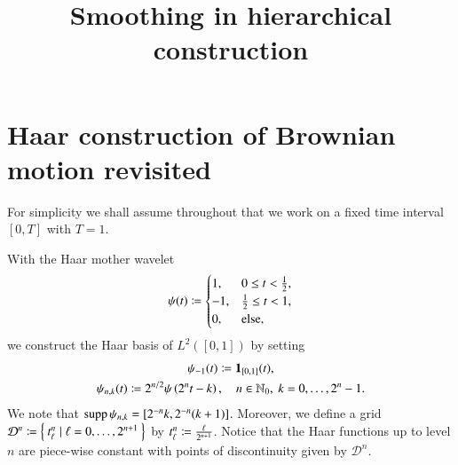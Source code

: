 \documentclass{amsart}
\begin{document}
\title{Smoothing in hierarchical construction}

\maketitle

\section{Haar construction of Brownian motion revisited}
\label{sec:haar-constr-brown}

For simplicity we shall assume throughout that we work on a fixed time
interval $[0,T]$ with $T = 1$.

With the Haar mother wavelet
\begin{equation}
  \label{eq:Haar-mother}
  \psi(t) \coloneqq
  \begin{cases}
    1, & 0 \le t < \frac{1}{2}, \\
    -1, & \frac{1}{2} \le t < 1, \\
    0, & \text{else},
  \end{cases}
\end{equation}
we construct the Haar basis of $L^2\left([0,1] \right)$ by setting
\begin{subequations}
  \label{eq:Haar-basis}
  \begin{gather}
    \label{eq:Haar-constant}
    \psi_{-1}(t) \coloneqq \mathbf{1}_{[0,1]}(t), \\
    \label{eq:Haar-nonconstant}
    \psi_{n,k}(t) \coloneqq 2^{n/2} \psi\left( 2^n t - k \right), \quad n \in
    \mathbb{N}_0, \ k = 0, \ldots, 2^n-1.
  \end{gather}
\end{subequations}
We note that $\operatorname{supp} \psi_{n,k} = [2^{-n}k, 2^{-n}(k+1)]$. Moreover, we define
a grid $\mathcal{D}^n \coloneqq \Set{t^n_\ell \mid \ell = 0, \ldots, 2^{n+1}}$ by
$t^n_\ell \coloneqq \frac{\ell}{2^{n+1}}$. Notice that the Haar functions up to level
$n$ are piece-wise constant with points of discontinuity given by
$\mathcal{D}^n$.
\end{document}
